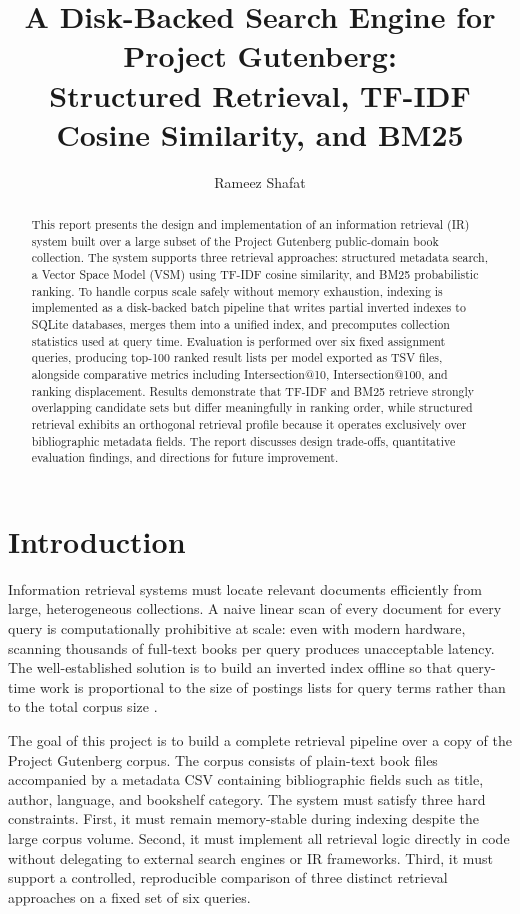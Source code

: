 \documentclass[sigconf]{acmart}
\title{A Disk-Backed Search Engine for Project Gutenberg:\\
Structured Retrieval, TF-IDF Cosine Similarity, and BM25}
\author{Rameez Shafat}
\affiliation{%
  \institution{Dublin City University}
  \city{Dublin}
  \country{Ireland}
}
\begin{document}
\begin{abstract}
This report presents the design and implementation of an information retrieval (IR) system built over a large subset of the Project Gutenberg public-domain book collection. The system supports three retrieval approaches: structured metadata search, a Vector Space Model (VSM) using TF-IDF cosine similarity, and BM25 probabilistic ranking. To handle corpus scale safely without memory exhaustion, indexing is implemented as a disk-backed batch pipeline that writes partial inverted indexes to SQLite databases, merges them into a unified index, and precomputes collection statistics used at query time. Evaluation is performed over six fixed assignment queries, producing top-100 ranked result lists per model exported as TSV files, alongside comparative metrics including Intersection@10, Intersection@100, and ranking displacement. Results demonstrate that TF-IDF and BM25 retrieve strongly overlapping candidate sets but differ meaningfully in ranking order, while structured retrieval exhibits an orthogonal retrieval profile because it operates exclusively over bibliographic metadata fields. The report discusses design trade-offs, quantitative evaluation findings, and directions for future improvement.
\end{abstract}

\maketitle

\section{Introduction}

Information retrieval systems must locate relevant documents efficiently from large, heterogeneous collections. A naive linear scan of every document for every query is computationally prohibitive at scale: even with modern hardware, scanning thousands of full-text books per query produces unacceptable latency. The well-established solution is to build an inverted index offline so that query-time work is proportional to the size of postings lists for query terms rather than to the total corpus size \cite{manning2008,zobel2006}.

The goal of this project is to build a complete retrieval pipeline over a copy of the Project Gutenberg corpus. The corpus consists of plain-text book files accompanied by a metadata CSV containing bibliographic fields such as title, author, language, and bookshelf category. The system must satisfy three hard constraints. First, it must remain memory-stable during indexing despite the large corpus volume. Second, it must implement all retrieval logic directly in code without delegating to external search engines or IR frameworks. Third, it must support a controlled, reproducible comparison of three distinct retrieval approaches on a fixed set of six queries.
\end{document}
